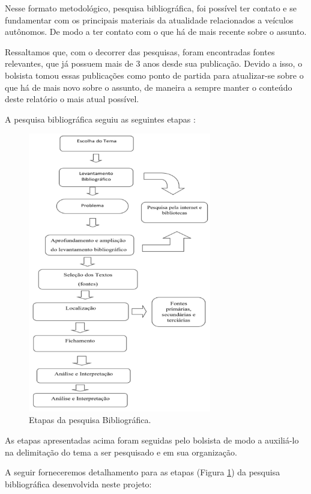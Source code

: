 Nesse formato metodológico, pesquisa bibliográfica, foi possível ter contato e se fundamentar com os principais materiais da atualidade relacionados a veículos autônomos. De modo a ter contato com o que há de mais recente sobre o assunto.

Ressaltamos que, com o decorrer das pesquisas, foram encontradas fontes relevantes, que já possuem mais de 3 anos desde sua publicação. Devido a isso, o bolsista tomou essas publicações como ponto de partida para atualizar-se sobre o que há de mais novo sobre o assunto, de maneira a sempre manter o conteúdo deste relatório o mais atual possível.

A pesquisa bibliográfica seguiu as seguintes etapas \cite{bibli}: 

\begin{figure}[H]
\centering
\includegraphics[width=8cm]{Figures/bibli.png}
\caption{Etapas da pesquisa Bibliográfica.}
\label{img_bibli}
\end{figure}

As etapas apresentadas acima foram seguidas pelo bolsista de modo a auxiliá-lo na
delimitação do tema a ser pesquisado e em sua organização.

\vspace {1cm}


A seguir forneceremos detalhamento para as etapas (Figura \ref{img_bibli}) da pesquisa bibliográfica desenvolvida neste projeto:

\vspace {1mm}



